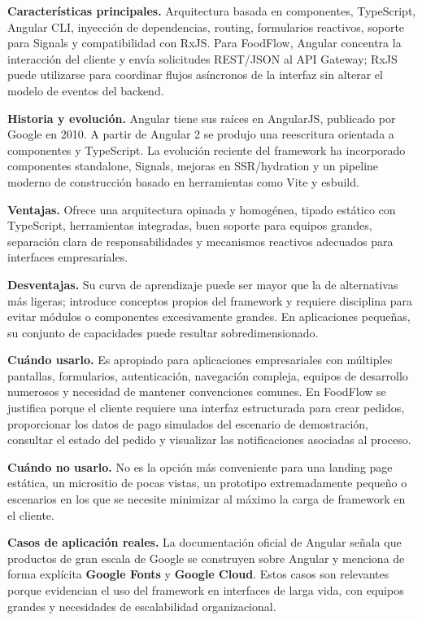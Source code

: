\documentclass[12pt,a4paper]{article}
\begin{document}
\textbf{Características principales.} Arquitectura basada en componentes, TypeScript, Angular CLI, inyección de dependencias, routing, formularios reactivos, soporte para Signals y compatibilidad con RxJS. Para FoodFlow, Angular concentra la interacción del cliente y envía solicitudes REST/JSON al API Gateway; RxJS puede utilizarse para coordinar flujos asíncronos de la interfaz sin alterar el modelo de eventos del backend.

\textbf{Historia y evolución.} Angular tiene sus raíces en AngularJS, publicado por Google en 2010. A partir de Angular 2 se produjo una reescritura orientada a componentes y TypeScript. La evolución reciente del framework ha incorporado componentes standalone, Signals, mejoras en SSR/hydration y un pipeline moderno de construcción basado en herramientas como Vite y esbuild. \cite{angular-overview}

\textbf{Ventajas.} Ofrece una arquitectura opinada y homogénea, tipado estático con TypeScript, herramientas integradas, buen soporte para equipos grandes, separación clara de responsabilidades y mecanismos reactivos adecuados para interfaces empresariales.

\textbf{Desventajas.} Su curva de aprendizaje puede ser mayor que la de alternativas más ligeras; introduce conceptos propios del framework y requiere disciplina para evitar módulos o componentes excesivamente grandes. En aplicaciones pequeñas, su conjunto de capacidades puede resultar sobredimensionado.

\textbf{Cuándo usarlo.} Es apropiado para aplicaciones empresariales con múltiples pantallas, formularios, autenticación, navegación compleja, equipos de desarrollo numerosos y necesidad de mantener convenciones comunes. En FoodFlow se justifica porque el cliente requiere una interfaz estructurada para crear pedidos, proporcionar los datos de pago simulados del escenario de demostración, consultar el estado del pedido y visualizar las notificaciones asociadas al proceso.

\textbf{Cuándo no usarlo.} No es la opción más conveniente para una landing page estática, un micrositio de pocas vistas, un prototipo extremadamente pequeño o escenarios en los que se necesite minimizar al máximo la carga de framework en el cliente.

\textbf{Casos de aplicación reales.} La documentación oficial de Angular señala que productos de gran escala de Google se construyen sobre Angular y menciona de forma explícita \textbf{Google Fonts} y \textbf{Google Cloud}. Estos casos son relevantes porque evidencian el uso del framework en interfaces de larga vida, con equipos grandes y necesidades de escalabilidad organizacional. \cite{angular-overview}
\end{document}
